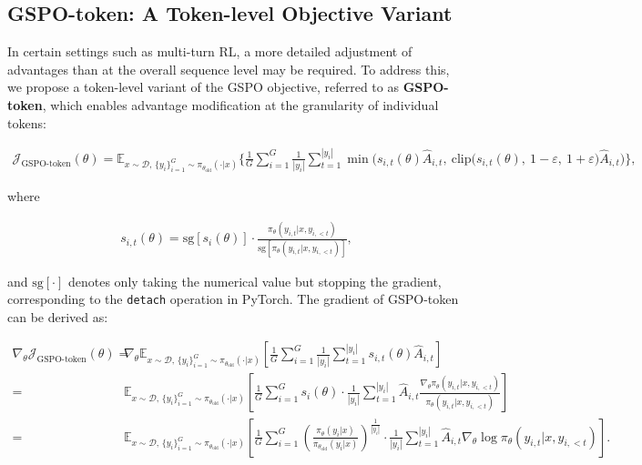 \subsection{GSPO-token: A Token-level Objective Variant}

In certain settings such as multi-turn RL, a more detailed adjustment of advantages than at the overall sequence level may be required. To address this, we propose a token-level variant of the GSPO objective, referred to as \textbf{GSPO-token}, which enables advantage modification at the granularity of individual tokens:

\begin{align}
\mathcal{J}_\text{GSPO-token}(\theta)
=
\mathbb{E}_{ x \sim \mathcal{D},\, \{y_i\}_{i=1}^G \sim \pi_{\theta_\text{old}}( \cdot | x) }
\Bigg\{
\frac{1}{G} \sum_{i=1}^{G} \frac{1}{|y_i|} \sum_{t=1}^{|y_i|} 
\min \Big( s_{i,t}(\theta) \widehat{A}_{i,t},\ 
\mathrm{clip}\big(s_{i,t}(\theta),\ 1 - {\varepsilon},\ 1 + {\varepsilon}\big) \widehat{A}_{i,t} \Big)
\Bigg\}
,
\label{equ:gspo-token}
\end{align}

where

\begin{align}
s_{i,t}(\theta) 
= \mathrm{sg} \left[ s_{i}(\theta) \right]  \cdot \frac{ \pi_{\theta} (y_{i,t} | x, y_{i,<t}) }{ \mathrm{sg} \left[ \pi_{\theta} (y_{i,t} | x, y_{i,<t}) \right] },
\end{align}

and $\mathrm{sg}[\cdot]$ denotes only taking the numerical value but stopping the gradient, corresponding to the \texttt{detach} operation in PyTorch. The gradient of GSPO-token can be derived as:

\begin{align}
\nabla_{\theta} \mathcal{J}_\text{GSPO-token}(\theta)
=&\ 
\nabla_{\theta} \mathbb{E}_{ x \sim \mathcal{D},\, \{y_i\}_{i=1}^G \sim \pi_{\theta_\text{old}}( \cdot | x) }
\left[ 
\frac{1}{G} \sum_{i=1}^{G}
\frac{1}{|y_i|} \sum_{t=1}^{|y_i|} 
s_{i,t}(\theta) \widehat{A}_{i,t}
\right] \\
=&\ 
\mathbb{E}_{ x \sim \mathcal{D},\, \{y_i\}_{i=1}^G \sim \pi_{\theta_\text{old}}( \cdot | x) }
\left[
\frac{1}{G} \sum_{i=1}^{G} s_i (\theta) \cdot \frac{1}{|y_i|} \sum_{t=1}^{|y_i|} 
\widehat{A}_{i,t} \frac{ \nabla_{\theta} \pi_{\theta} (y_{i,t} | x, y_{i,<t}) }{ \pi_{\theta} (y_{i,t} | x, y_{i,<t}) }
\right] \\
=&\ 
\mathbb{E}_{ x \sim \mathcal{D},\, \{y_i\}_{i=1}^G \sim \pi_{\theta_\text{old}}( \cdot | x) }
\left[
\frac{1}{G} \sum_{i=1}^{G}  \left( \frac{ \pi_{\theta} (y_i | x) }{ \pi_{\theta_\text{old}} (y_i | x)} \right)^{\frac{1}{|y_i|}}
\cdot \frac{1}{|y_i|} \sum_{t=1}^{|y_i|}
\widehat{A}_{i,t} \nabla_{\theta} \log \pi_{\theta} (y_{i,t} | x, y_{i,<t})  
\right].
\label{equ:gspo-token_grad}
\end{align}


